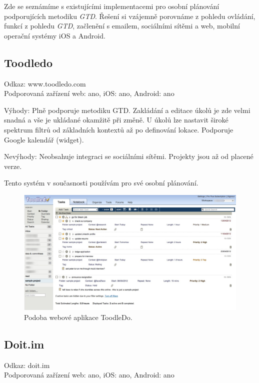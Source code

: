 \documentclass[thesis=B,czech]{FITthesis}[2012/06/26]
\begin{document}
Zde se seznámíme s existujícími implementacemi pro osobní plánování podporujících metodiku \textit{GTD}. Řešení si vzájemně porovnáme z pohledu ovládání, funkcí z pohledu \textit{GTD}, začlenění s emailem, sociálními sítěmi a web, mobilní operační systémy iOS a Android.

\subsection{Toodledo}

Odkaz: www.toodledo.com\cite{gtd_existing_compare_toodledo}\\
Podporovaná zařízení web: ano, iOS: ano, Android: ano

Výhody:
Plně podporuje metodiku GTD. Zakládání a editace úkolů je zde velmi snadná a vše je ukládané okamžitě při změně. U úkolů lze nastavit široké spektrum filtrů od základních kontextů až po definování lokace.
Podporuje Google kalendář (widget).

Nevýhody:
Neobsahuje integraci se sociálními sítěmi.  
Projekty jsou až od placené verze.

Tento systém v současnosti používám pro své osobní plánování.

\begin{figure}\centering
	\includegraphics[width=1\textwidth]{pictures/toodledo_overview}
	\caption{Podoba webové aplikace ToodleDo.\cite{toodledo_overview}}\label{fig:toodlefo_overview}
\end{figure}

\newpage

\subsection{Doit.im}

Odkaz: doit.im\cite{gtd_existing_compare_doit}\\
Podporovaná zařízení web: ano, iOS: ano, Android: ano
\end{document}

